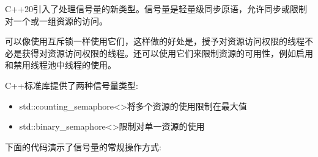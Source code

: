 
C++20引入了处理信号量的新类型。信号量是轻量级同步原语，允许同步或限制对一个或一组资源的访问。

可以像使用互斥锁一样使用它们，这样做的好处是，授予对资源访问权限的线程不必是获得对资源访问权限的线程。还可以使用它们来限制资源的可用性，例如启用和禁用线程池中线程的使用。

C++标准库提供了两种信号量类型:

\begin{itemize}
\item 
std::counting\_semaphore<>将多个资源的使用限制在最大值

\item
std::binary\_semaphore<>限制对单一资源的使用
\end{itemize}


下面的代码演示了信号量的常规操作方式:


